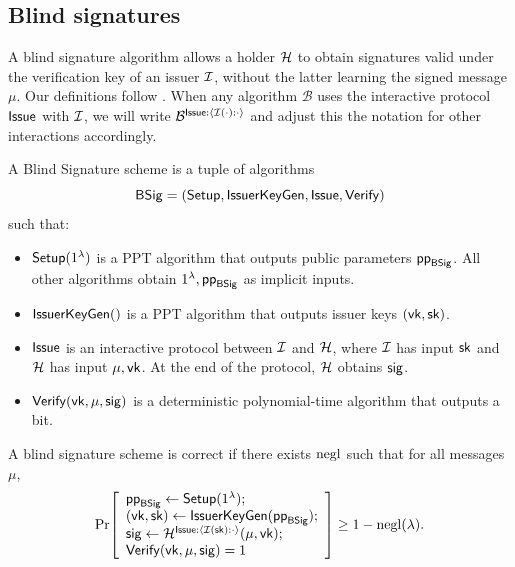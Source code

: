 


\subsection{Blind signatures}
A blind signature algorithm allows a holder $\mathcal{H}$ to obtain signatures valid under the verification key of an issuer $\mathcal{I}$, without the latter learning the signed message $\mu$. Our definitions follow \cite{C:Fischlin06}. When any algorithm $\mathcal{B}$ uses the interactive protocol $\mathsf{Issue}$ with $\mathcal{I}$, we will write $\mathcal{B}^{\mathsf{Issue}:\langle \mathcal{I}(\cdot):\cdot \rangle}$ and adjust this the notation for other interactions accordingly.

\begin{definition}\label{def:bs-syntax}
	A Blind Signature scheme is a tuple of algorithms
	\[
	\mathsf{BSig}=(\mathsf{Setup},\mathsf{IssuerKeyGen},\mathsf{Issue},\mathsf{Verify})
	\]
	such that:
	\begin{itemize}[leftmargin=1.25em]
		\item $\mathsf{Setup}(1^\lambda)$ is a PPT algorithm that outputs public parameters $\mathsf{pp}_{\mathsf{BSig}}$. All other algorithms obtain $1^\lambda,\mathsf{pp}_{\mathsf{BSig}}$ as implicit inputs.
		\item $\mathsf{IssuerKeyGen}()$ is a PPT algorithm that outputs issuer keys $(\mathsf{vk},\mathsf{sk})$.
		\item $\mathsf{Issue}$ is an interactive protocol between $\mathcal{I}$ and $\mathcal{H}$, where $\mathcal{I}$ has input $\mathsf{sk}$ and $\mathcal{H}$ has input $\mu,\mathsf{vk}$. At the end of the protocol, $\mathcal{H}$ obtains $\mathsf{sig}$.
		\item $\mathsf{Verify}(\mathsf{vk},\mu,\mathsf{sig})$ is a deterministic polynomial-time algorithm that outputs a bit.
	\end{itemize}
\end{definition}

\begin{definition}[Correctness]\label{def:bs-correctness}
	A blind signature scheme is correct if there exists \(\mathrm{negl}\) such that for all messages \(\mu\),
	\[
	\Pr\!\left[
	\begin{array}{l}
		\mathsf{pp}_{\mathsf{BSig}} \gets \mathsf{Setup}(1^\lambda); \\
		(\mathsf{vk},\mathsf{sk})\gets \mathsf{IssuerKeyGen}(\mathsf{pp}_{\mathsf{BSig}});\\
		\mathsf{sig}\gets \mathcal{H}^{\mathsf{Issue}: \langle \mathcal{I}(\mathsf{sk}): \cdot  \rangle }(\mu,\mathsf{vk});\\
		\mathsf{Verify}(\mathsf{vk},\mu,\mathsf{sig})=1
	\end{array}
	\right]
	\ge 1-\mathrm{negl}(\lambda).
	\]
\end{definition}


